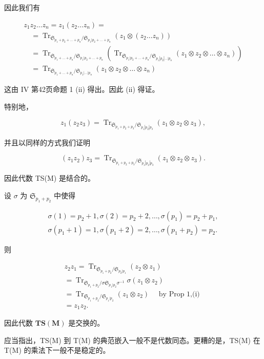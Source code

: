 因此我们有

\[
\begin{array}{l} z _ {1} z _ {2} \dots z _ {n} = z _ {1} (z _ {2} \dots z _ {n}) = \\ \quad = \operatorname{Tr} _ {\mathfrak {S} _ {p _ {1} + p _ {2} + \dots + p _ {n}} / \mathfrak {S} _ {p _ {1} | p _ {2} + \dots + p _ {n}}} (z _ {1} \otimes (z _ {2} \dots z _ {n})) \\ \quad = \operatorname{Tr} _ {\mathfrak {S} _ {p _ {1} + \dots + p _ {n}} / \mathfrak {S} _ {p _ {1} | p _ {2} + \dots + p _ {n}}} (\operatorname{Tr} _ {\mathfrak {S} _ {p _ {1} | p _ {2} + \dots + p _ {n}} / \mathfrak {S} _ {p _ {1} | p _ {2} | \dots | p _ {n}}} (z _ {1} \otimes z _ {2} \otimes \dots \otimes z _ {n})) \\ \quad = \operatorname{Tr} _ {\mathfrak {S} _ {p _ {1} + \dots + p _ {n}} / \mathfrak {S} _ {p _ {1} | \dots | p _ {n}}} (z _ {1} \otimes z _ {2} \otimes \dots \otimes z _ {n}) \end{array}
\]

这由 IV 第42页命题 1 (ii) 得出。因此 (ii) 得证。

特别地，

\[
z _ {1} \left(z _ {2} z _ {3}\right) = \operatorname{Tr} _ {\mathfrak {S} _ {p _ {1} + p _ {2} + p _ {3}} / \mathfrak {S} _ {p _ {1} | p _ {2} | p _ {3}}} \left(z _ {1} \otimes z _ {2} \otimes z _ {3}\right),
\]

并且以同样的方式我们证明

\[
\left(z _ {1} z _ {2}\right) z _ {3} = \operatorname{Tr} _ {\mathfrak {S} _ {p _ {1} + p _ {2} + p _ {3}} / \mathfrak {S} _ {p _ {1} | p _ {2} | p _ {3}}} \left(z _ {1} \otimes z _ {2} \otimes z _ {3}\right).
\]

因此代数 TS(M) 是结合的。

设 \(\sigma\) 为 \(\mathfrak{S}_{p_1 + p_2}\) 中使得

\[
\begin{array}{l} \sigma (1) = p _ {2} + 1, \sigma (2) = p _ {2} + 2, \dots , \sigma (p _ {1}) = p _ {2} + p _ {1}, \\ \sigma (p _ {1} + 1) = 1, \sigma (p _ {1} + 2) = 2, \dots , \sigma (p _ {1} + p _ {2}) = p _ {2}. \end{array}
\]

则

\[
\begin{array}{l} z _ {2} z _ {1} = \operatorname{Tr} _ {\mathfrak {S} _ {p _ {1} + p _ {2}} / \mathfrak {S} _ {p _ {2} | p _ {1}}} (z _ {2} \otimes z _ {1}) \\ = \operatorname{Tr} _ {\mathfrak {S} _ {p _ {1} + p _ {2}} / \sigma \mathfrak {S} _ {p _ {1} | p _ {2}} \sigma^ {- 1}} \sigma (z _ {1} \otimes z _ {2}) \\ = \operatorname{Tr} _ {\mathfrak {S} _ {p _ {1} + p _ {2}} / \mathfrak {S} _ {p _ {1} | p _ {2}}} (z _ {1} \otimes z _ {2}) \quad \text { by   Prop   1,(i) } \\ = z _ {1} z _ {2}. \end{array}
\]

因此代数 \(\mathbf{TS}(\mathbf{M})\) 是交换的。

应当指出，TS(M) 到 T(M) 的典范嵌入一般不是代数同态。更糟的是，TS(M) 在 T(M) 的乘法下一般不是稳定的。

